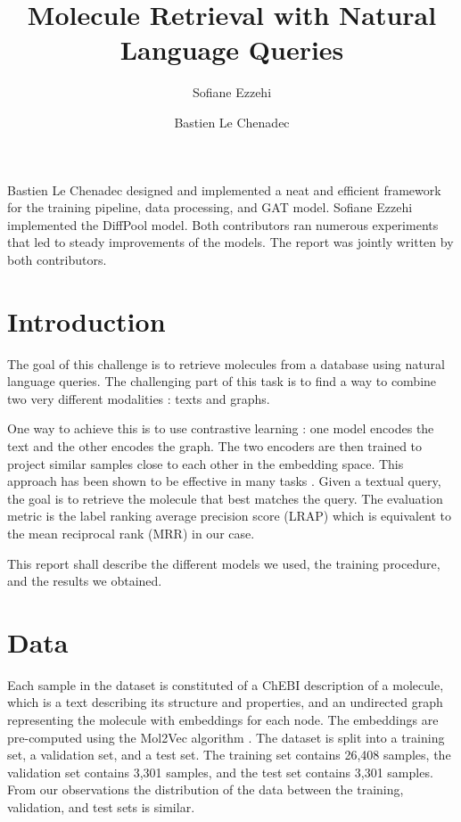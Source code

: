 \documentclass[switch, 12pt]{article}
\title{Molecule Retrieval with Natural Language Queries}
\author[1]{Sofiane Ezzehi}
\author[1]{Bastien Le Chenadec}
\affil[1]{École des Ponts ParisTech}
\begin{document}
\maketitle

\begin{contribstatement}
    Bastien Le Chenadec designed and implemented a neat and efficient framework for the training pipeline, data processing, and GAT model. Sofiane Ezzehi implemented the DiffPool model. Both contributors ran numerous experiments that led to steady improvements of the models. The report was jointly written by both contributors.
\end{contribstatement}
\vspace{0.35cm}

\begin{multicols}{2}
    \section{Introduction}

    The goal of this challenge is to retrieve molecules from a database using natural language queries. The challenging part of this task is to find a way to combine two very different modalities : texts and graphs.

    One way to achieve this is to use contrastive learning : one model encodes the text and the other encodes the graph. The two encoders are then trained to project similar samples close to each other in the embedding space. This approach has been shown to be effective in many tasks \cite{chen-2020,gao-2021}. Given a textual query, the goal is to retrieve the molecule that best matches the query. The evaluation metric is the label ranking average precision score (LRAP) which is equivalent to the mean reciprocal rank (MRR) in our case.

    This report shall describe the different models we used, the training procedure, and the results we obtained.

    \section{Data}

    Each sample in the dataset is constituted of a ChEBI description of a molecule, which is a text describing its structure and properties, and an undirected graph representing the molecule with embeddings for each node. The embeddings are pre-computed using the Mol2Vec algorithm \cite{mol2vec}. The dataset is split into a training set, a validation set, and a test set. The training set contains 26,408 samples, the validation set contains 3,301 samples, and the test set contains 3,301 samples. From our observations the distribution of the data between the training, validation, and test sets is similar.


\end{multicols}
\end{document}
